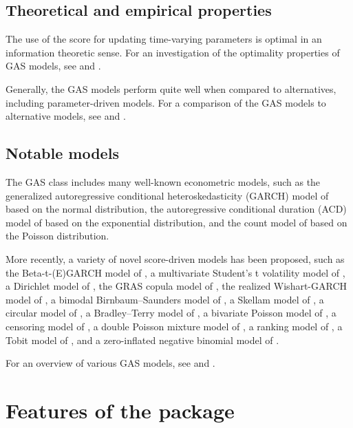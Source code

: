 \subsection{Theoretical and empirical properties}\label{theoretical-and-empirical-properties}

The use of the score for updating time-varying parameters is optimal in an information theoretic sense. For an investigation of the optimality properties of GAS models, see \citet{Blasques2015} and \citet{Blasques2021b}.

Generally, the GAS models perform quite well when compared to alternatives, including parameter-driven models. For a comparison of the GAS models to alternative models, see \citet{Koopman2016} and \citet{Blazsek2020}.

\subsection{Notable models}\label{notable-models}

The GAS class includes many well-known econometric models, such as the generalized autoregressive conditional heteroskedasticity (GARCH) model of \citet{Bollerslev1986} based on the normal distribution, the autoregressive conditional duration (ACD) model of \citet{Engle1998} based on the exponential distribution, and the count model of \citet{Davis2003} based on the Poisson distribution.

More recently, a variety of novel score-driven models has been proposed, such as the Beta-t-(E)GARCH model of \citet{Harvey2008}, a multivariate Student's t volatility model of \citet{Creal2011}, a Dirichlet model of \citet{Calvori2013}, the GRAS copula model of \citet{DeLiraSalvatierra2015}, the realized Wishart-GARCH model of \citet{Hansen2016a}, a bimodal Birnbaum--Saunders model of \citet{Fonseca2018}, a Skellam model of \citet{Koopman2018}, a circular model of \citet{Harvey2024}, a Bradley--Terry model of \citet{Gorgi2019}, a bivariate Poisson model of \citet{Koopman2019}, a censoring model of \citet{Harvey2020}, a double Poisson mixture model of \citet{Holy2022b}, a ranking model of \citet{Holy2022f}, a Tobit model of \citet{Harvey2023}, and a zero-inflated negative binomial model of \citet{Blasques2024a}.

For an overview of various GAS models, see \citet{Artemova2022} and \citet{Harvey2022}.

\section{Features of the package}\label{features-of-the-package}

